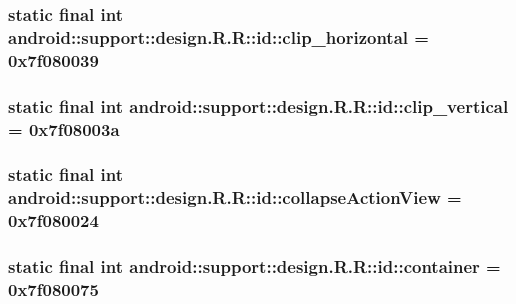 \hypertarget{classandroid_1_1support_1_1design_1_1_r_1_1id_db78e4369257fb183a8415d90314f385}{
\subsubsection[{clip\_\-horizontal}]{\setlength{\rightskip}{0pt plus 5cm}static final int android::support::design.R.R::id::clip\_\-horizontal = 0x7f080039}}
\label{classandroid_1_1support_1_1design_1_1_r_1_1id_db78e4369257fb183a8415d90314f385}


\hypertarget{classandroid_1_1support_1_1design_1_1_r_1_1id_5a850405f5f3f1c2d77fc2c0d00fb856}{
\subsubsection[{clip\_\-vertical}]{\setlength{\rightskip}{0pt plus 5cm}static final int android::support::design.R.R::id::clip\_\-vertical = 0x7f08003a}}
\label{classandroid_1_1support_1_1design_1_1_r_1_1id_5a850405f5f3f1c2d77fc2c0d00fb856}


\hypertarget{classandroid_1_1support_1_1design_1_1_r_1_1id_5bf14fff593c7fbe6e71ac283527d67f}{
\subsubsection[{collapseActionView}]{\setlength{\rightskip}{0pt plus 5cm}static final int android::support::design.R.R::id::collapseActionView = 0x7f080024}}
\label{classandroid_1_1support_1_1design_1_1_r_1_1id_5bf14fff593c7fbe6e71ac283527d67f}


\hypertarget{classandroid_1_1support_1_1design_1_1_r_1_1id_6adf7eeb1047c504b45ce692ade8407f}{
\subsubsection[{container}]{\setlength{\rightskip}{0pt plus 5cm}static final int android::support::design.R.R::id::container = 0x7f080075}}
\label{classandroid_1_1support_1_1design_1_1_r_1_1id_6adf7eeb1047c504b45ce692ade8407f}


